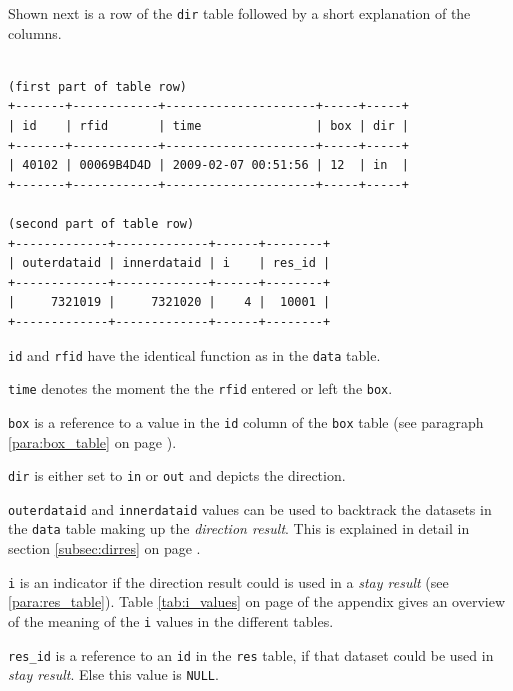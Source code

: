 Shown next is a row of the \lstinline|dir| table followed by a short explanation of the columns.

\codescript
\begin{lstlisting}[frame=none]

(first part of table row)
+-------+------------+---------------------+-----+-----+
| id    | rfid       | time                | box | dir |
+-------+------------+---------------------+-----+-----+
| 40102 | 00069B4D4D | 2009-02-07 00:51:56 | 12  | in  |
+-------+------------+---------------------+-----+-----+

(second part of table row)
+-------------+-------------+------+--------+
| outerdataid | innerdataid | i    | res_id |
+-------------+-------------+------+--------+
|     7321019 |     7321020 |    4 |  10001 | 
+-------------+-------------+------+--------+
\end{lstlisting}

\begin{mydesc}
  \item \lstinline|id| and \lstinline|rfid| have the identical function as in the \lstinline|data| table.
  \item \lstinline|time| denotes the moment the the \lstinline|rfid| entered or left the \lstinline|box|.
  \item \lstinline|box| is a reference to a value in the \lstinline|id| column of the \lstinline|box| table (see paragraph \ref{para:box_table} on page \pageref{para:box_table}).
  \item \lstinline|dir| is either set to \lstinline|in| or \lstinline|out| and depicts the direction.
  \item \lstinline|outerdataid| and \lstinline|innerdataid| values can be used to backtrack the datasets in the \lstinline|data| table making up the \textit{direction result}. This is explained in detail in section \ref{subsec:dirres} on page \pageref{subsec:dirres}.
  \item \lstinline|i| is an indicator if the direction result could is used in a \textit{stay result} (see \ref{para:res_table}). Table \ref{tab:i_values} on page \pageref{tab:i_values} of the appendix gives an overview of the meaning of the \lstinline|i| values in the different tables.
  \item \lstinline|res_id| is a reference to an \lstinline|id| in the \lstinline|res| table, if that dataset could be used in \textit{stay result}. Else this value is \lstinline|NULL|.
\end{mydesc}

